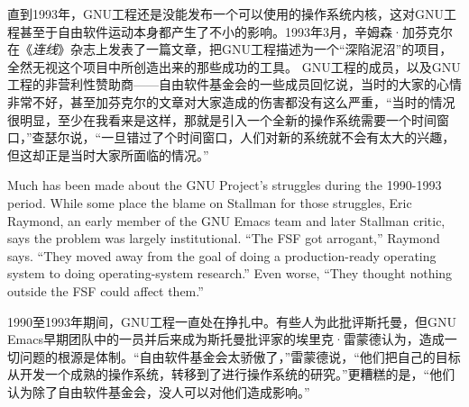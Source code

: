 \ifdefined\chs
直到1993年，GNU工程还是没能发布一个可以使用的操作系统内核，这对GNU工程甚至于自由软件运动本身都产生了不小的影响。1993年3月，辛姆森·加芬克尔在《\textit{连线}》杂志上发表了一篇文章，把GNU工程描述为一个``深陷泥沼''的项目，全然无视这个项目中所创造出来的那些成功的工具。 GNU工程的成员，以及GNU工程的非营利性赞助商——自由软件基金会的一些成员回忆说，当时的大家的心情非常不好，甚至加芬克尔的文章对大家造成的伤害都没有这么严重，``当时的情况很明显，至少在我看来是这样，那就是引入一个全新的操作系统需要一个时间窗口，''查瑟尔说，``一旦错过了个时间窗口，人们对新的系统就不会有太大的兴趣，但这却正是当时大家所面临的情况。''
\fi

\ifdefined\eng
Much has been made about the GNU Project's struggles during the 1990-1993 period. While some place the blame on Stallman for those struggles, Eric Raymond, an early member of the GNU Emacs team and later Stallman critic, says the problem was largely institutional. ``The FSF got arrogant,'' Raymond says. ``They moved away from the goal of doing a production-ready operating system to doing operating-system research.'' Even worse, ``They thought nothing outside the FSF could affect them.''
\fi

\ifdefined\chs
1990至1993年期间，GNU工程一直处在挣扎中。有些人为此批评斯托曼，但GNU Emacs早期团队中的一员并后来成为斯托曼批评家的埃里克·雷蒙德认为，造成一切问题的根源是体制。``自由软件基金会太骄傲了，''雷蒙德说，``他们把自己的目标从开发一个成熟的操作系统，转移到了进行操作系统的研究。''更糟糕的是，``他们认为除了自由软件基金会，没人可以对他们造成影响。''
\fi

